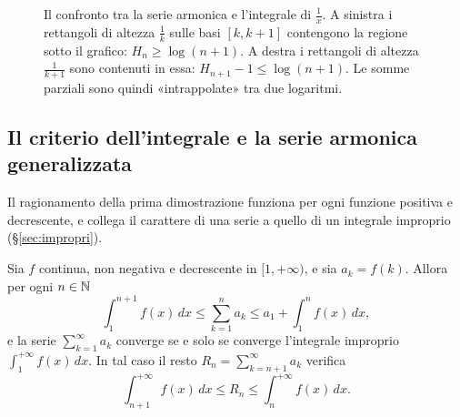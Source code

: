 \begin{figure}[htb]
\centering
{}\hfill
{}
\caption{Il confronto tra la serie armonica e l'integrale di $\frac1x$. A sinistra i
rettangoli di altezza $\frac1k$ sulle basi $[k,k+1]$ contengono la regione sotto il grafico:
$H_{n}\ge\log(n+1)$. A destra i rettangoli di altezza $\frac1{k+1}$ sono contenuti in essa:
$H_{n+1}-1\le\log(n+1)$. Le somme parziali sono quindi «intrappolate» tra due logaritmi.}
\label{fig:armonica-integrale}
\end{figure}

\subsection{Il criterio dell'integrale e la serie armonica generalizzata}

Il ragionamento della prima dimostrazione funziona per ogni funzione positiva e
decrescente, e collega il carattere di una serie a quello di un integrale improprio
(\S\ref{sec:impropri}).

\begin{teorema}\label{teo:criterio-integrale}
Sia $f$ continua, non negativa e decrescente in $[1,+\infty)$, e sia $a_{k}=f(k)$. Allora
per ogni $n\in\mathbb{N}$
\begin{equation}\label{eq:criterio-integrale}
  \int_{1}^{n+1}f(x)\,dx\le\sum_{k=1}^{n}a_{k}\le a_{1}+\int_{1}^{n}f(x)\,dx ,
\end{equation}
e la serie $\sum_{k=1}^{\infty}a_{k}$ converge se e solo se converge l'integrale improprio
$\int_{1}^{+\infty}f(x)\,dx$. In tal caso il resto $R_{n}=\sum_{k=n+1}^{\infty}a_{k}$ verifica
\begin{equation}\label{eq:resto-integrale-serie}
  \int_{n+1}^{+\infty}f(x)\,dx\le R_{n}\le\int_{n}^{+\infty}f(x)\,dx .
\end{equation}
\end{teorema}

